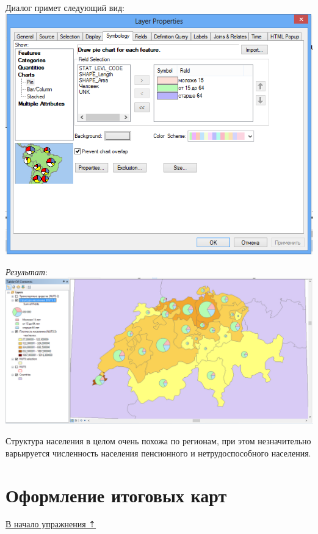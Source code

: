 \documentclass[]{book}
\theoremstyle{definition}
\theoremstyle{definition}
\theoremstyle{definition}
\theoremstyle{remark}
\begin{document}
\begin{enumerate}
  Диалог примет следующий вид: \includegraphics{images/Ex08/image29.png}

  \emph{Результат}: \includegraphics{images/Ex08/image30.png}
\end{enumerate}

Структура населения в целом очень похожа по регионам, при этом
незначительно варьируется численность населения пенсионного и
нетрудоспособного населения.

\hypertarget{stat-map-economic-design}{%
\section{Оформление итоговых карт}\label{stat-map-economic-design}}

\protect\hyperlink{stat-map-economic}{В начало упражнения ⇡}
\end{document}

